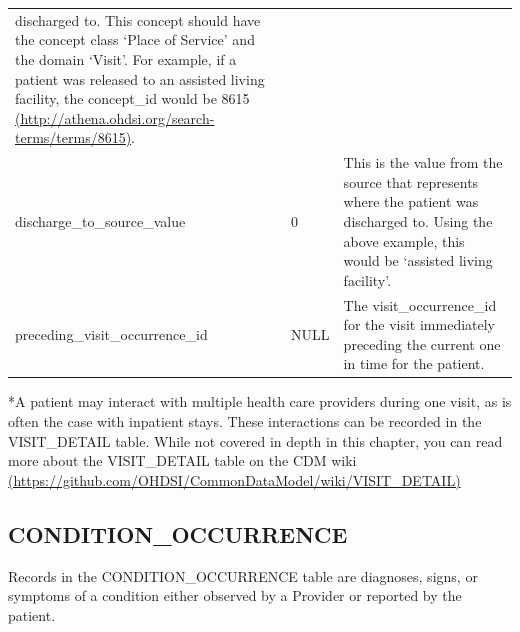 \documentclass[]{book}
\begin{document}
\begin{longtable}[]{@{}lll@{}}
\begin{minipage}[t]{0.49\columnwidth}
discharged to. This concept should have the concept class `Place of
Service' and the domain `Visit'. For example, if a patient was released
to an assisted living facility, the concept\_id would be 8615
\href{http://athena.ohdsi.org/search-terms/terms/8615}{(http://athena.ohdsi.org/search-terms/terms/8615)}.\strut
\end{minipage}\tabularnewline
\begin{minipage}[t]{0.25\columnwidth}\raggedright\strut
discharge\_to\_source\_value\strut
\end{minipage} & \begin{minipage}[t]{0.17\columnwidth}\raggedright\strut
0\strut
\end{minipage} & \begin{minipage}[t]{0.49\columnwidth}\raggedright\strut
This is the value from the source that represents where the patient was
discharged to. Using the above example, this would be `assisted living
facility'.\strut
\end{minipage}\tabularnewline
\begin{minipage}[t]{0.25\columnwidth}\raggedright\strut
preceding\_visit\_occurrence\_id\strut
\end{minipage} & \begin{minipage}[t]{0.17\columnwidth}\raggedright\strut
NULL\strut
\end{minipage} & \begin{minipage}[t]{0.49\columnwidth}\raggedright\strut
The visit\_occurrence\_id for the visit immediately preceding the
current one in time for the patient.\strut
\end{minipage}\tabularnewline
\bottomrule
\end{longtable}

*A patient may interact with multiple health care providers during one
visit, as is often the case with inpatient stays. These interactions can
be recorded in the VISIT\_DETAIL table. While not covered in depth in
this chapter, you can read more about the VISIT\_DETAIL table on the CDM
wiki
\href{https://github.com/OHDSI/CommonDataModel/wiki/VISIT_DETAIL}{(https://github.com/OHDSI/CommonDataModel/wiki/VISIT\_DETAIL)}

\subsection{CONDITION\_OCCURRENCE}\label{conditionOccurrence}

Records in the CONDITION\_OCCURRENCE table are diagnoses, signs, or
symptoms of a condition either observed by a Provider or reported by the
patient.
\end{document}
